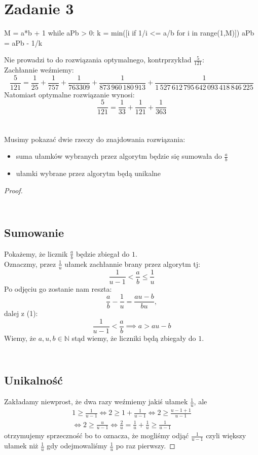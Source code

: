 \documentclass{article}
\begin{document}
\section{Zadanie 3}
\begin{python}
M = a*b + 1
while aPb > 0:
    k = min([i if 1/i <= a/b for i in range(1,M)])
    aPb = aPb - 1/k
\end{python}
Nie prowadzi to do rozwiązania optymalnego, kontrprzykład $\frac{5}{121}$:\\
Zachłannie weźmiemy:
$$
\frac{5}{121} = \frac{1}{25} + \frac{1}{757} + \frac{1}{763309} + \frac{1}{873\,960\,180\,913}+\frac{1}{1\,527\,612\,795\,642\,093\,418\,846\,225}
$$
Natomiast optymalne rozwiązanie wynosi:
$$
\frac{5}{121}=\frac{1}{33}+\frac{1}{121}+\frac{1}{363}
$$
\\\\Musimy pokazać dwie rzeczy do znajdowania rozwiązania:
\begin{itemize}
    \item suma ułamków wybranych przez algorytm będzie się sumowała do $\frac{a}{b}$
    \item ułamki wybrane przez algorytm będą unikalne
\end{itemize}
\begin{proof}
\subsection*{\\Sumowanie}
Pokażemy, że licznik $\frac a b$ będzie zbiegał do $1$.\\
Oznaczmy, przez $\frac 1 u$ ułamek zachłannie brany przez algorytm tj: 
\begin{equation}
\frac{1}{u-1} < \frac{a}{b} \leq \frac 1 u
\end{equation}
Po odjęciu go zostanie nam reszta: 
\begin{equation}
\frac a b - \frac 1 u = \frac{au - b}{bu},
\end{equation}
dalej z (1):
\begin{equation}
\frac 1 {u-1} < \frac a b \implies a > au - b
\end{equation}
Wiemy, że $a,u,b \in \mathbb{N}$ stąd wiemy, że liczniki będą zbiegały do $1$.
\clearpage
\setcounter{equation}{0}
\subsection*{\\Unikalność}
Zakładamy niewprost, że dwa razy weźmiemy jakiś ułamek $\frac 1 u$, ale
\begin{align*}
1 \geq \frac 1 {u-1} \iff 2 \geq 1 + \frac 1 {u-1} \iff 2 \geq  \frac{u - 1 + 1}{u-1} \\
\iff 2 \geq \frac u {u-1} \iff \frac 2 u = \frac 1 u + \frac 1 u \geq \frac 1 {u-1} 
\end{align*}
otrzymujemy sprzeczność bo to oznacza, że mogliśmy odjąć $\frac 1 {u-1}$ czyli większy ułamek niż $\frac 1 u$ gdy odejmowaliśmy $\frac 1 u$ po raz pierwszy.
\end{proof}
\clearpage
\end{document}
